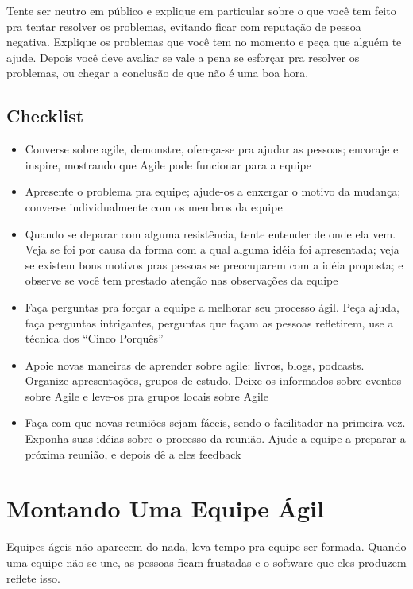 \documentclass[a4paper, 10pt, font=plain]{abnt}
\begin{document}
Tente ser neutro em público e explique em particular sobre o que você tem feito pra tentar resolver os problemas, evitando ficar com reputação de pessoa negativa. Explique os problemas que você tem no momento e peça que alguém te ajude. Depois você deve avaliar se vale a pena se esforçar pra resolver os problemas, ou chegar a conclusão de que não é uma boa hora.


\section{Checklist}
\begin{itemize}
\item Converse sobre agile, demonstre, ofereça-se pra ajudar as pessoas; encoraje e inspire, mostrando que Agile pode funcionar para a equipe
\item Apresente o problema pra equipe; ajude-os a enxergar o motivo da mudança; converse individualmente com os membros da equipe
\item Quando se deparar com alguma resistência, tente entender de onde ela vem. Veja se foi por causa da forma com a qual alguma idéia foi apresentada; veja se existem bons motivos pras pessoas se preocuparem com a idéia proposta; e observe se você tem prestado atenção nas observações da equipe
\item Faça perguntas pra forçar a equipe a melhorar seu processo ágil. Peça ajuda, faça perguntas intrigantes, perguntas que façam as pessoas refletirem, use a técnica dos ``Cinco Porquês''
\item Apoie novas maneiras de aprender sobre agile: livros, blogs, podcasts. Organize apresentações, grupos de estudo. Deixe-os informados sobre eventos sobre Agile e leve-os pra grupos locais sobre Agile
\item Faça com que novas reuniões sejam fáceis, sendo o facilitador na primeira vez. Exponha suas idéias sobre o processo da reunião. Ajude a equipe a preparar a próxima reunião, e depois dê a eles feedback
\end{itemize}




\chapter{Montando Uma Equipe Ágil}
Equipes ágeis não aparecem do nada, leva tempo pra equipe ser formada. Quando uma equipe não se une, as pessoas ficam frustadas e o software que eles produzem reflete isso.
\end{document}
